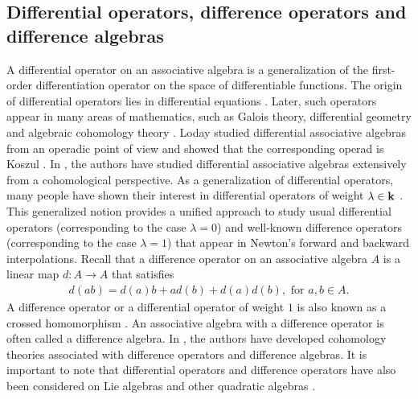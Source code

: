 \documentclass[a4paper,reqno,10pt]{amsart}
\theoremstyle{plain}
\theoremstyle{definition}
\theoremstyle{remark}
\begin{document}
\subsection{Differential operators, difference operators and difference algebras}
A differential operator on an associative algebra is a generalization of the first-order differentiation operator on the space of differentiable functions. The origin of differential operators lies in differential equations \cite{ritt}. Later, such operators appear in many areas of mathematics, such as Galois theory, differential geometry and algebraic cohomology theory \cite{kolchin,magid,bott}. Loday studied differential associative algebras from an operadic point of view and showed that the corresponding operad is Koszul \cite{loday}. In \cite{das-mandal,guo-li,laza}, the authors have studied differential associative algebras extensively from a cohomological perspective. As a generalization of differential operators, many people have shown their interest in differential operators of weight $\lambda \in {\bf k}$ \cite{guo-li}. This generalized notion provides a unified approach to study usual differential operators (corresponding to the case $\lambda = 0$) and well-known difference operators (corresponding to the case $\lambda = 1$) that appear in Newton's forward and backward interpolations. Recall that a difference operator on an associative algebra $A$ is a linear map $d: A \rightarrow A$ that satisfies
\begin{align}\label{diffe-iden}
    d(ab) = d(a) b + a d(b) + d(a) d(b), \text{ for } a, b \in A.
\end{align}
A difference operator or a differential operator of weight $1$ is also known as a crossed homomorphism \cite{das}. An associative algebra with a difference operator is often called a difference algebra. In \cite{das,das-ram}, the authors have developed cohomology theories associated with difference operators and difference algebras. It is important to note that differential operators and difference operators have also been considered on Lie algebras and other quadratic algebras \cite{lyu,jia}.
\end{document}
